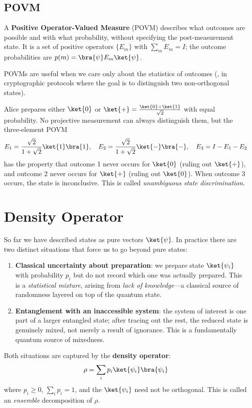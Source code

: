 \documentclass[oneside]{academica}
\begin{document}
\subsection{POVM}

A \textbf{Positive Operator-Valued Measure} (POVM) describes what outcomes are possible and with what probability, without specifying the post-measurement state.
It is a set of positive operators $\{E_m\}$ with $\sum_m E_m=I$; the outcome probabilities are $p(m)=\bra{\psi}E_m\ket{\psi}$.

POVMs are useful when we care only about the statistics of outcomes (\eg, in cryptographic protocols where the goal is to distinguish two non-orthogonal states).

\begin{example*}
  Alice prepares either $\ket{0}$ or $\ket{+}=\frac{\ket{0}+\ket{1}}{\sqrt{2}}$ with equal probability.
  No projective measurement can always distinguish them, but the three-element POVM
  \begin{equation*}
    E_1=\frac{\sqrt{2}}{1+\sqrt{2}}\ket{1}\bra{1},\quad
    E_2=\frac{\sqrt{2}}{1+\sqrt{2}}\ket{-}\bra{-},\quad
    E_3=I-E_1-E_2
  \end{equation*}
  has the property that outcome 1 never occurs for $\ket{0}$ (ruling out $\ket{+}$), and outcome 2 never occurs for $\ket{+}$ (ruling out $\ket{0}$).
  When outcome 3 occurs, the state is inconclusive.
  This is called \emph{unambiguous state discrimination}.
\end{example*}

\section{Density Operator}

So far we have described states as pure vectors $\ket{\psi}$.
In practice there are two distinct situations that force us to go beyond pure states:
\begin{enumerate}
  \item \textbf{Classical uncertainty about preparation}: we prepare state $\ket{\psi_i}$ with probability $p_i$ but do not record which one was actually prepared.
    This is a \emph{statistical mixture}, arising from \emph{lack of knowledge}---a classical source of randomness layered on top of the quantum state.
  \item \textbf{Entanglement with an inaccessible system}: the system of interest is one part of a larger entangled state; after tracing out the rest, the reduced state is genuinely mixed, not merely a result of ignorance.
    This is a fundamentally quantum source of mixedness.
\end{enumerate}
Both situations are captured by the \textbf{density operator}:
\begin{equation*}
  \rho=\sum_i p_i\ket{\psi_i}\bra{\psi_i}
\end{equation*}
where $p_i\ge0$, $\sum_i p_i=1$, and the $\ket{\psi_i}$ need not be orthogonal.
This is called an \emph{ensemble} decomposition of $\rho$.
\end{document}

